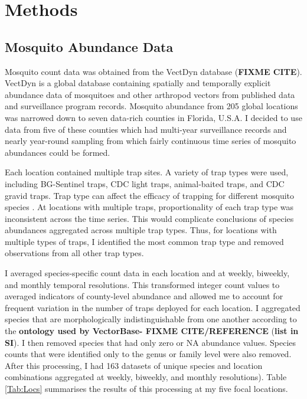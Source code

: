 \section{Methods}

\subsection{Mosquito Abundance Data}

Mosquito count data was obtained from the VectDyn database (\textbf{FIXME CITE}). VectDyn is a global database containing spatially and temporally explicit abundance data of mosquitoes and other arthropod vectors from published data and surveillance program records. Mosquito abundance from 205 global locations was narrowed down to seven data-rich counties in Florida, U.S.A. I decided to use data from five of these counties which had multi-year surveillance records and nearly year-round sampling from which fairly continuous time series of mosquito abundances could be formed. 

Each location contained multiple trap sites. A variety of trap types were used, including BG-Sentinel traps, CDC light traps, animal-baited traps, and CDC gravid traps. Trap type can affect the efficacy of trapping for different mosquito species \citep{Li2016}. At locations with multiple traps, proportionality of each trap type was inconsistent across the time series. This would complicate conclusions of species abundances aggregated across multiple trap types. Thus, for locations with multiple types of traps, I identified the most common trap type and removed observations from all other trap types. 


I averaged species-specific count data in each location and at weekly, biweekly, and monthly temporal resolutions. This transformed integer count values to averaged indicators of county-level abundance and allowed me to account for frequent variation in the number of traps deployed for each location. I aggregated species that are morphologically indistinguishable from one another according to the \textbf{ontology used by VectorBase- FIXME CITE/REFERENCE} (\textbf{list in SI}). I then removed species that had only zero or NA abundance values. Species counts that were identified only to the genus or family level were also removed. After this processing, I had 163 datasets of unique species and location combinations aggregated at weekly, biweekly, and monthly resolutions). Table \ref{Tab:Locs} summarises the results of this processing at my five focal locations.

